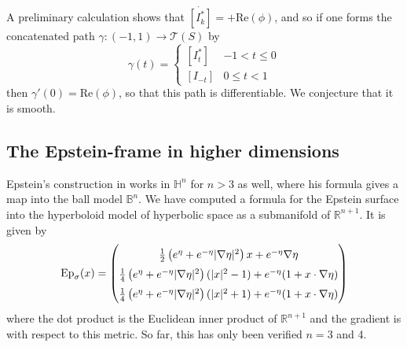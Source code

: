 \documentclass{amsart}
\newcommand{\R}{\mathbb{R}}
\renewcommand{\H}{\mathbb{H}}
\begin{document}
A preliminary calculation shows that $\dot{[I_k^*]} = +\mathrm{Re}(\phi)$, and so if one forms the concatenated path $\gamma : (-1,1) \to \mathcal{T}(S)$ by 
\[
\gamma(t) = 
\begin{cases}
[I_t^*]  & -1 < t \leq 0 \\
[I_{-t}] & 0 \leq t < 1
\end{cases}
\]
then $\gamma'(0) = \mathrm{Re}(\phi)$, so that this path is differentiable. 
We conjecture that it is smooth. 

\subsection{The Epstein-frame in higher dimensions}



Epstein's construction in \cite{epstein1984} works in $\H^n$ for $n > 3$ as well, where his formula gives a map into the ball model $\mathbb{B}^n$.
We have computed a formula for the Epstein surface into the hyperboloid model of hyperbolic space as a submanifold of $\R^{n+1}$.
It is given by 
\[
\mathrm{Ep}_\sigma(x) = 
\def\arraystretch{1.5}
\begin{pmatrix}
\frac{1}{2}\left( e^\eta + e^{-\eta} | \nabla \eta |^2 \right)x + e^{-\eta} \nabla \eta \\
\frac{1}{4} \left(e^\eta + e^{-\eta} | \nabla \eta |^2 \right)( | x |^2 - 1) + e^{-\eta}(1 + x \cdot \nabla\eta) \\
\frac{1}{4} \left(e^\eta + e^{-\eta} | \nabla \eta |^2 \right)( | x |^2 + 1) + e^{-\eta}(1 + x \cdot \nabla\eta)
\end{pmatrix}
\]
where the dot product is the Euclidean inner product of $\R^{n+1}$ and the gradient is with respect to this metric.
So far, this has only been verified $n = 3$ and 4.
\end{document}
